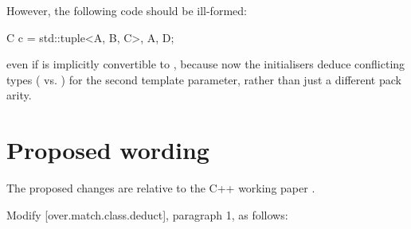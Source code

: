 However, the following code should be ill-formed:

\begin{codeblock}
C c = {std::tuple<A, B, C>{}, A{}, D{}};
\end{codeblock}

even if  is implicitly convertible to , because now the initialisers deduce conflicting types ( vs. ) for the second template parameter, rather than just a different pack arity.

\section{Proposed wording}


The proposed changes are relative to the C++ working paper \cite{N4849}. 

Modify [over.match.class.deduct], paragraph 1, as follows:


